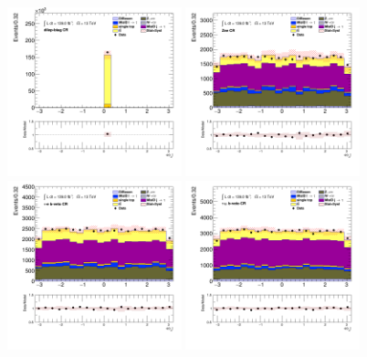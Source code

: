 		\begin{figure}[!htp]
			\begin{center}    
			\includegraphics[width=0.45\textwidth]{chapters/chapter6_HPlus/images/taulep/tau_0_phi_DILEP_BTAG.png}
			\includegraphics[width=0.45\textwidth]{chapters/chapter6_HPlus/images/taulep/tau_0_phi_ZEE.png} \\
			\includegraphics[width=0.45\textwidth]{chapters/chapter6_HPlus/images/taulep/tau_0_phi_TAUEL_BVETO.png} 
			\includegraphics[width=0.45\textwidth]{chapters/chapter6_HPlus/images/taulep/tau_0_phi_TAUMU_BVETO.png} \\

\end{center}
\end{figure}
